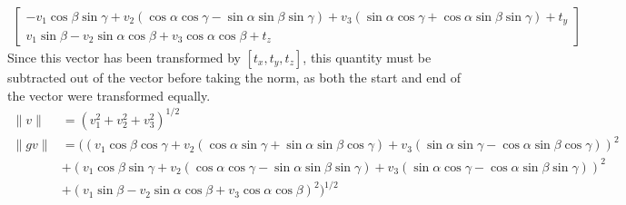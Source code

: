 \documentclass[12pt]{article}
\begin{document}
\begin{enumerate}
\begin{enumerate}
\begin{align*}
\begin{bmatrix}
		- v_1 \cos\beta \sin\gamma + v_2 (\cos\alpha \cos\gamma - \sin\alpha \sin\beta \sin\gamma) + v_3 ( \sin\alpha \cos\gamma + \cos\alpha \sin\beta \sin\gamma) + t_y \\
		v_1\sin\beta - v_2\sin\alpha \cos\beta + v_3 \cos\alpha\cos\beta + t_z
		\end{bmatrix}
		\end{align*}
		Since this vector has been transformed by $[t_x, t_y, t_z]$, this quantity must be subtracted out of the vector before taking the norm, as both the start and end of the vector were transformed equally.
		\begin{align*}
		\| v \| &= (v_1^2 + v_2^2 + v_3^2)^{1/2} \\
		\| gv \| &= \big(\left(v_1\cos\beta\cos\gamma + v_2 (\cos\alpha \sin\gamma + \sin\alpha \sin\beta \cos\gamma)  + v_3 (\sin\alpha \sin\gamma - \cos\alpha \sin\beta \cos\gamma)\right)^2 \\ & + \left(v_1 \cos\beta \sin\gamma + v_2 (\cos\alpha \cos\gamma - \sin\alpha \sin\beta \sin\gamma) + v_3 ( \sin\alpha \cos\gamma - \cos\alpha \sin\beta \sin\gamma)\right)^2 \\ &+ \left(v_1\sin\beta - v_2\sin\alpha \cos\beta + v_3 \cos\alpha\cos\beta\right)^2\big)^{1/2}
		\end{align*}
		

\end{enumerate}
\end{enumerate}
\end{document}
